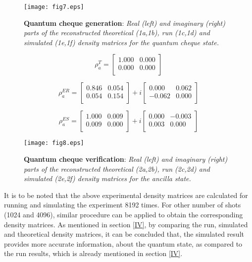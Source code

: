 \documentclass[aps,pra,twocolumn,groupedaddress,showpacs,showkeys]{revtex4-1}
\begin{document}
\begin{figure}[h]
    \centering
    \texttt{[image: fig7.eps]}
    \caption{\textbf{Quantum cheque generation}: \emph{Real (left) and imaginary (right) parts of the reconstructed theoretical (1a,1b), run (1c,1d) and simulated (1e,1f) density matrices for the quantum cheque state.}}
    \label{fig:7}
\end{figure}

\[
   \rho^{T}_{a}=
  \left[ {\begin{array}{cc}
   1.000 & 0.000 \\
   0.000 & 0.000 \\
  \end{array} } \right]
\]
 
\[
   \rho^{ER}_{a}=
  \left[ {\begin{array}{cc}
   0.846 & 0.054 \\
   0.054 & 0.154 \\
  \end{array} } \right]+ i\left[ {\begin{array}{cc}
   0.000 & 0.062 \\
   -0.062 & 0.000 \\
  \end{array} } \right]
\]

\[
   \rho^{ES}_{a}=
  \left[ {\begin{array}{cc}
   1.000 & 0.009 \\
   0.009 & 0.000 \\
  \end{array} } \right]+ i\left[ {\begin{array}{cc}
   0.000 & -0.003 \\
   0.003 & 0.000 \\
  \end{array} } \right]
\]

\begin{figure}
    \centering
    \texttt{[image: fig8.eps]}
    \caption{\textbf{Quantum cheque verification}: \emph{Real (left) and imaginary (right) parts of the reconstructed theoretical (2a,2b), run (2c,2d) and simulated (2e,2f) density matrices for the ancilla state.}}
    \label{fig:8}
\end{figure}

It is to be noted that the above experimental density matrices are calculated for running and simulating the experiment 8192 times. For other number of shots (1024 and 4096), similar procedure can be applied to obtain the corresponding density matrices. As mentioned in section \ref{IV}, by comparing the run, simulated and theoretical density matrices, it can be concluded that, the simulated result provides more accurate information, about the quantum state, as compared to the run results, which is already mentioned in section \ref{IV}. 
\end{document}
